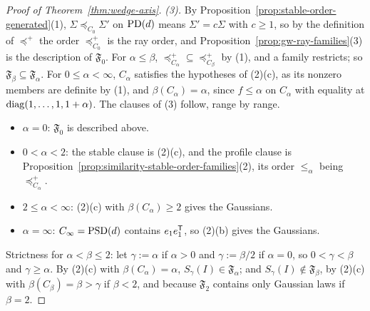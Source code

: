 \begin{proof}[Proof of Theorem~\ref{thm:wedge-axis}]
\emph{(3).} By Proposition~\ref{prop:stable-order-generated}(1), $\Sigma \preceq_{C_0} \Sigma'$ on $\mathrm{PD}(d)$ means $\Sigma' = c\Sigma$
with $c \ge 1$, so by the definition of $\preceq^+$ the order $\preceq^+_{C_0}$ is the ray order, and
Proposition~\ref{prop:gw-ray-families}(3) is the description of $\mathfrak F_0$. For $\alpha \le \beta$,
$\preceq^+_{C_\alpha} \subseteq \preceq^+_{C_\beta}$ by (1), and a family restricts; so
$\mathfrak F_\beta \subseteq \mathfrak F_\alpha$. For $0 \le \alpha < \infty$, $C_\alpha$ satisfies the
hypotheses of (2)(c), as its nonzero members are definite by (1), and $\beta(C_\alpha) = \alpha$, since
$f \le \alpha$ on $C_\alpha$ with equality at $\operatorname{diag}(1, \dots, 1, 1+\alpha)$. The clauses of (3) follow,
range by range.
\begin{itemize}
\item $\alpha = 0$: $\mathfrak F_0$ is described above.
\item $0 < \alpha < 2$: the stable clause is (2)(c), and the profile clause is
Proposition~\ref{prop:similarity-stable-order-families}(2), its order $\le_\alpha$ being $\preceq^+_{C_\alpha}$.
\item $2 \le \alpha < \infty$: (2)(c) with $\beta(C_\alpha) \ge 2$ gives the Gaussians.
\item $\alpha = \infty$: $C_\infty = \mathrm{PSD}(d)$ contains $e_1e_1^{\mathsf{T}}$, so (2)(b) gives the Gaussians.
\end{itemize}
Strictness for $\alpha < \beta \le 2$: let $\gamma := \alpha$ if $\alpha > 0$ and $\gamma := \beta/2$ if
$\alpha = 0$, so $0 < \gamma < \beta$ and $\gamma \ge \alpha$. By (2)(c) with $\beta(C_\alpha) = \alpha$,
$S_\gamma(I) \in \mathfrak F_\alpha$; and $S_\gamma(I) \notin \mathfrak F_\beta$, by (2)(c) with $\beta(C_\beta) =
\beta > \gamma$ if $\beta < 2$, and because $\mathfrak F_2$ contains only Gaussian laws if $\beta = 2$.
\end{proof}
